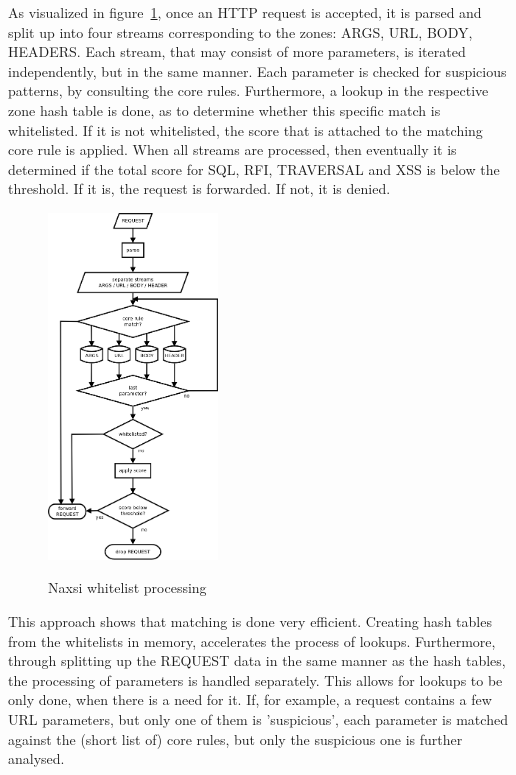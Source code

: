 \documentclass[Naxsi]{subfiles}
\begin{document}
As visualized in figure~\ref{fig:whitelist_processing}, once an HTTP request is accepted, it is parsed and split up into four streams corresponding to the zones: ARGS, URL, BODY, HEADERS. Each stream, that may consist of more parameters, is iterated independently, but in the same manner. Each parameter is checked for suspicious patterns, by consulting the core rules. Furthermore, a lookup in the respective zone hash table is done, as to determine whether this specific match is whitelisted. If it is not whitelisted, the score that is attached to the matching core rule is applied. When all streams are processed, then eventually it is determined if the total score for SQL, RFI, TRAVERSAL and XSS is below the threshold. If it is, the request is forwarded. If not, it is denied. 

\begin{figure}[H]
\caption{Naxsi whitelist processing}
\centering
\includegraphics[width=0.4\textwidth] {images/whitelist_processing.png}
\label{fig:whitelist_processing}
\end{figure}

This approach shows that matching is done very efficient. Creating hash tables from the whitelists in memory, accelerates the process of lookups. Furthermore, through splitting up the REQUEST data in the same manner as the hash tables, the processing of parameters is handled separately. This allows for lookups to be only done, when there is a need for it. If, for example, a request contains a few URL parameters, but only one of them is 'suspicious', each parameter is matched against the (short list of) core rules, but only the suspicious one is further analysed.
\end{document}
